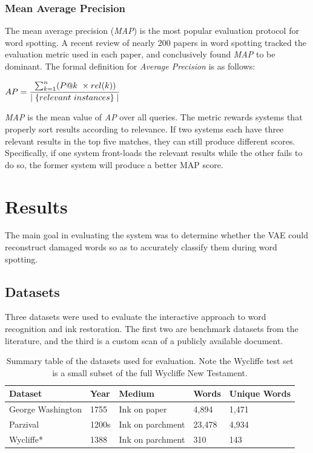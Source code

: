 \documentclass[final]{ukthesis}
\begin{document}
\subsection{Mean Average Precision}
The mean average precision ({\em MAP}) is the most popular evaluation protocol for word spotting. A recent review \cite{giotis2017survey} of nearly 200 papers in word spotting tracked the evaluation metric used in each paper, and conclusively found {\em MAP} to be dominant. The formal definition for {\em Average Precision} is as follows:

\begin{center}
\begin{math}
{AP}=\cfrac{\sum_{k=1}^n (P@k\ \times rel(k))}{\mid\{relevant \ instances\}\mid}
\end{math}
\end{center}

{\em MAP} is the mean value of {\em AP} over all queries. The metric rewards systems that properly sort results according to relevance. If two systems each have three relevant results in the top five matches, they can still produce different scores. Specifically, if one system front-loads the relevant results while the other fails to do so, the former system will produce a better MAP score.


%
%
%
\chapter{Results}
The main goal in evaluating the system was to determine whether the VAE could reconstruct damaged words so as to accurately classify them during word spotting.

%
%
\section{Datasets}
Three datasets were used to evaluate the interactive approach to word recognition and ink restoration. The first two are benchmark datasets from the literature, and the third is a custom scan of a publicly available document.


\begin{table}[h]
\centering
\begin{tabular}{lllll}
\textbf{Dataset}  & \textbf{Year} & \textbf{Medium}  & \textbf{Words} & \textbf{Unique Words} \\
\hline
George Washington & 1755                  & Ink on paper     & 4,894          & 1,471                 \\
Parzival          & 1200s                 & Ink on parchment & 23,478         & 4,934                 \\
Wycliffe*         & 1388                  & Ink on parchment & 310            & 143                  
\end{tabular}
\caption{Summary table of the datasets used for evaluation. Note the Wycliffe test set is a small subset of the full Wycliffe New Testament.}
\label{table:datasets}
\end{table}
\end{document}
